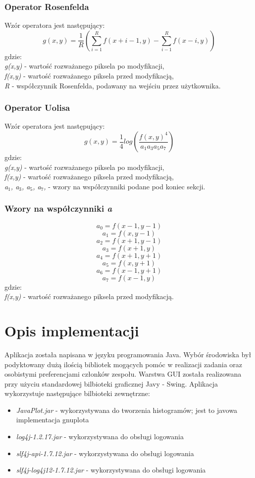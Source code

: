 \documentclass{classrep}
\begin{document}
\subsubsection{Operator Rosenfelda}
Wzór operatora jest następujący:
\[ g(x,y) = \frac{1}{R}(\sum^R_{i=1} f(x + i - 1, y) - \sum^R_{i-1} f(x - i, y))  \]
gdzie:\\
\textit{g(x,y)} - wartość rozważanego piksela po modyfikacji,\\
\textit{f(x,y)} - wartość rozważanego piksela przed modyfikacją,\\
\textit{R} - współczynnik Rosenfelda, podawany na wejściu przez użytkownika.

\subsubsection{Operator Uolisa}
Wzór operatora jest następujący:
\[ g(x,y) = \frac{1}{4} log(\frac{f(x,y)^4}{a_1a_3a_5a_7})  \]
gdzie:\\
\textit{g(x,y)} - wartość rozważanego piksela po modyfikacji,\\
\textit{f(x,y)} - wartość rozważanego piksela przed modyfikacją,\\
\textit{a$_{\text{1}}$, a$_{\text{3}}$, a$_{\text{5}}$, a$_{\text{7}}$,} - wzory na współczynniki podane pod koniec sekcji.\\

\subsubsection{Wzory na współczynniki \textit{a}}
\[ a_0 = f(x - 1, y - 1)\]
\[ a_1 = f(x, y - 1)\]
\[ a_2 = f(x + 1, y - 1)\]
\[ a_3 = f(x + 1, y)\]
\[ a_4 = f(x + 1, y + 1)\]
\[ a_5 = f(x, y + 1)\]
\[ a_6 = f(x - 1, y + 1)\]
\[ a_7 = f(x - 1, y)\]
gdzie:\\
\textit{f(x,y)} - wartość rozważanego piksela przed modyfikacją.\\

\section{Opis implementacji}
Aplikacja została napisana w języku programowania Java. Wybór środowiska był podyktowany dużą ilością bibliotek mogących pomóc w realizacji zadania oraz osobistymi preferencjami członków zespołu. Warstwa GUI została realizowana przy użyciu standardowej bilbioteki graficznej Javy - Swing. Aplikacja wykorzystuje następujące bilbioteki zewnętrzne:
\begin{itemize}
\item \textit{JavaPlot.jar} - wykorzystywana do tworzenia histogramów; jest to javowa implementacja gnuplota 
\item \textit{log4j-1.2.17.jar} - wykorzystywana do obsługi logowania
\item \textit{slf4j-api-1.7.12.jar} - wykorzystywana do obsługi logowania
\item \textit{slf4j-log4j12-1.7.12.jar} - wykorzystywana do obsługi logowania
\end{itemize}
\end{document}
